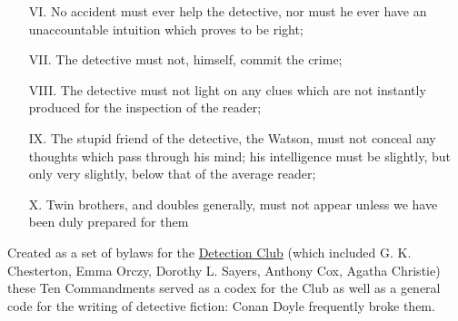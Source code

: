 \documentclass[a4paper,landscape,headrule,footrule,xetex]{foils}
\begin{document}
\begin{itemize}\addtolength{\itemsep}{-0.5ex}
\item[VI.]   No accident must ever help the detective, nor must he ever have an unaccountable intuition which proves to be right;
\item[VII.]  The detective must not, himself, commit the crime;
\item[VIII.] The detective must not light on any clues which are not
  instantly produced for the inspection of the reader;
\item[IX.] The stupid friend of the detective, the Watson, must not
  conceal any thoughts which pass through his mind; his intelligence
  must be slightly, but only very slightly, below that of the average
  reader;
\item[X.] Twin brothers, and doubles generally, must not appear unless
  we have been duly prepared for them
\end{itemize}

Created as a set of bylaws for the
\href{https://en.wikipedia.org/wiki/Detection_Club}{Detection Club}
(which included G. K.  Chesterton, Emma Orczy, Dorothy L. Sayers,
Anthony Cox, Agatha Christie) these Ten Commandments served as a codex
for the Club as well as a general code for the writing of detective
fiction: Conan Doyle frequently broke them.


\small


\end{document}
